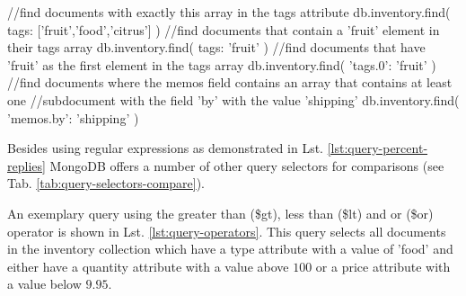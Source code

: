 \begin{listing}
    \begin{javascriptcode}
//find documents with exactly this array in the tags attribute
db.inventory.find( { tags: ['fruit','food','citrus'] } )
//find documents that contain a 'fruit' element in their tags array
db.inventory.find( { tags: 'fruit'} )
//find documents that have 'fruit' as the first element in the tags array
db.inventory.find( {'tags.0': 'fruit'} )
//find documents where the memos field contains an array that contains at least one
//subdocument with the field 'by' with the value 'shipping'
db.inventory.find( {'memos.by': 'shipping'} )
    \end{javascriptcode}
    \caption{Array queries on an inventory collection}
    \label{lst:array-query}
\end{listing}

Besides using regular expressions as demonstrated in Lst. \ref{lst:query-percent-replies} MongoDB
offers a number of other query selectors for comparisons (see Tab. \ref{tab:query-selectors-compare}).

An exemplary query using the greater than (\$gt), less than (\$lt) and or (\$or) operator
is shown in Lst. \ref{lst:query-operators}.
This query selects all documents in the inventory collection which have a type attribute with
a value of 'food' and either have  a quantity attribute with a value above $100$ or a price attribute
with a value below $9.95$.

\begin{listing}
    \caption[Exemplary usage of query operators]{Exemplary usage of query operators\footcite[][9]{mongo_crud_manual}}
    \label{lst:query-operators}
\end{listing}


